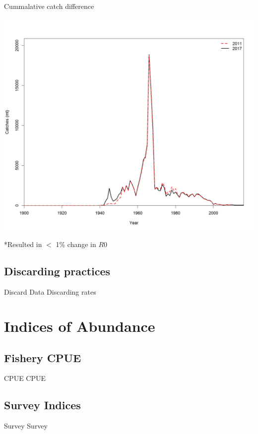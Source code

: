 \documentclass[pdf]{beamer}\usepackage[]{graphicx}\usepackage[]{color}
\begin{document}
\begin{frame}{Cummalative catch difference}
  \begin{center}
    \includegraphics[scale = 0.32, trim={0, 0, 0, 2cm}, clip]{figures/Catch_Comparison.png}
  \end{center}
  *Resulted in $<$ 1\% change in $R0$ 
\end{frame}

\subsection{Discarding practices}
\begin{frame}{Discard Data}
  Discarding rates
\end{frame}

\section{Indices of Abundance}
\subsection{Fishery CPUE}
\begin{frame}{CPUE}
  CPUE
\end{frame}

\subsection{Survey Indices}
\begin{frame}{Survey}
  Survey
\end{frame}
\end{document}
